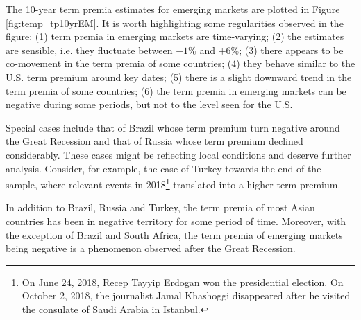 {The 10-year term premia estimates for emerging markets are plotted in Figure \ref{fig:temp_tp10yrEM}. It is worth highlighting some regularities observed in the figure: (1) term premia in emerging markets are time-varying; (2) the estimates are sensible, i.e. they fluctuate between $-1$\% and $+6$\%; (3) there appears to be co-movement in the term premia of some countries; (4) they behave similar to the U.S. term premium around key dates; (5) there is a slight downward trend in the term premia of some countries; (6) the term premia in emerging markets can be negative during some periods, but not to the level seen for the U.S.
	

Special cases include that of Brazil whose term premium turn negative around the Great Recession and that of Russia whose term premium declined considerably. These cases might be reflecting local conditions and deserve further analysis. Consider, for example, the case of Turkey towards the end of the sample, where relevant events in 2018\footnote{On June 24, 2018, Recep Tayyip Erdogan won the presidential election. On October 2, 2018, the journalist Jamal Khashoggi disappeared after he visited the consulate of Saudi Arabia in Istanbul.} translated into a higher term premium.

 In addition to Brazil, Russia and Turkey, the term premia of most Asian countries has been in negative territory for some period of time. Moreover, with the exception of Brazil and South Africa, the term premia of emerging markets being negative is a phenomenon observed after the Great Recession.

%	

}
